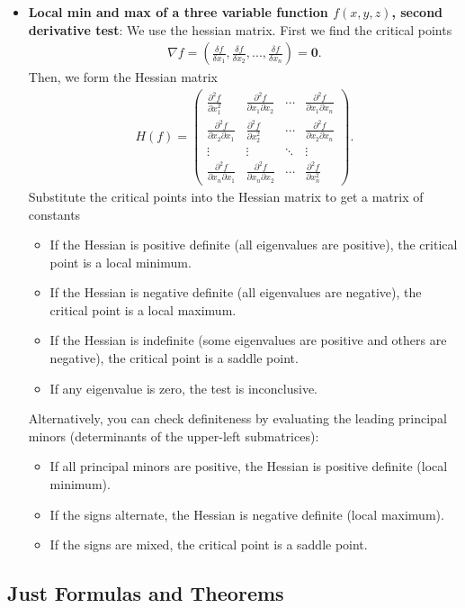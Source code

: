 \documentclass{report}
\begin{document}
\begin{itemize}
        \item \textbf{Local min and max of a three variable function $f(x,y,z)$, second derivative test}: We use the hessian matrix. First we find the critical points 
            \begin{align*}
                \nabla f = \left(\frac{\delta f}{\delta x_{1}}, \frac{\delta f}{\delta x_{2}}, ... , \frac{\delta f}{\delta x_{n}}\right) = \mathbf{0}
            .\end{align*}
            Then, we form the Hessian matrix
            \begin{align*}
                                H(f) = 
                \begin{pmatrix}
                    \frac{\partial^2 f}{\partial x_1^2} & \frac{\partial^2 f}{\partial x_1 \partial x_2} & \cdots & \frac{\partial^2 f}{\partial x_1 \partial x_n} \\
                    \frac{\partial^2 f}{\partial x_2 \partial x_1} & \frac{\partial^2 f}{\partial x_2^2} & \cdots & \frac{\partial^2 f}{\partial x_2 \partial x_n} \\
                    \vdots & \vdots & \ddots & \vdots \\
                    \frac{\partial^2 f}{\partial x_n \partial x_1} & \frac{\partial^2 f}{\partial x_n \partial x_2} & \cdots & \frac{\partial^2 f}{\partial x_n^2}
                \end{pmatrix}
            .\end{align*}
            Substitute the critical points into the Hessian matrix to get a matrix of constants
            \bigbreak \noindent 
            \begin{itemize}
                \item If the Hessian is positive definite (all eigenvalues are positive), the critical point is a local minimum.
                \item If the Hessian is negative definite (all eigenvalues are negative), the critical point is a local maximum.
                \item If the Hessian is indefinite (some eigenvalues are positive and others are negative), the critical point is a saddle point.
                \item If any eigenvalue is zero, the test is inconclusive.
            \end{itemize}
            Alternatively, you can check definiteness by evaluating the leading principal minors (determinants of the upper-left submatrices):
            \begin{itemize}
                \item If all principal minors are positive, the Hessian is positive definite (local minimum).
                \item If the signs alternate, the Hessian is negative definite (local maximum).
                \item If the signs are mixed, the critical point is a saddle point.
            \end{itemize}
    \end{itemize}


    \pagebreak 
    \subsection{Just Formulas and Theorems}
    \begin{itemize}
    \end{itemize}
\end{document}
